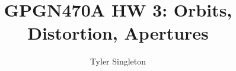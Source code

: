 \documentclass{homework}
\title{GPGN470A HW 3: Orbits, Distortion, Apertures}
\author{Tyler Singleton}
\begin{document}
\maketitle

\question
\lipsum[2-4]

\begin{sub-question}
    \lipsum[2-4]
\end{sub-question}

\question
\lipsum[2-4]

\begin{sub-question}
    \lipsum[2-4]
\end{sub-question}

\begin{sub-question}
    \lipsum[2-4]
\end{sub-question}
\end{document}
